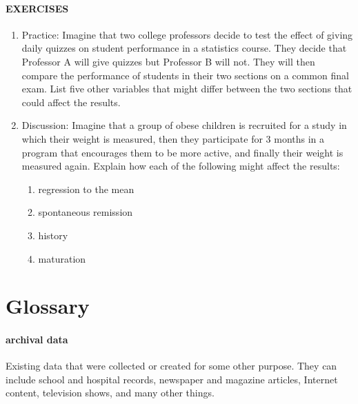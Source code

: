 \documentclass[
]{krantz}
\providecommand{\tightlist}{%
  \setlength{\itemsep}{0pt}\setlength{\parskip}{0pt}}
\begin{document}
\hypertarget{exercises-21}{%
\paragraph*{EXERCISES}\label{exercises-21}}

\begin{enumerate}
\def\labelenumi{\arabic{enumi}.}
\tightlist
\item
  Practice: Imagine that two college professors decide to test the effect of giving daily quizzes on student performance in a statistics course. They decide that Professor A will give quizzes but Professor B will not. They will then compare the performance of students in their two sections on a common final exam. List five other variables that might differ between the two sections that could affect the results.
\item
  Discussion: Imagine that a group of obese children is recruited for a study in which their weight is measured, then they participate for 3 months in a program that encourages them to be more active, and finally their weight is measured again. Explain how each of the following might affect the results:

  \begin{enumerate}
  \def\labelenumii{\alph{enumii}.}
  \tightlist
  \item
    regression to the mean
  \item
    spontaneous remission
  \item
    history
  \item
    maturation
  \end{enumerate}
\end{enumerate}

\hypertarget{glossary-8}{%
\section{Glossary}\label{glossary-8}}

\hypertarget{archival-data-1}{%
\paragraph*{archival data}\label{archival-data-1}}

Existing data that were collected or created for some other purpose. They can include school and hospital records, newspaper and magazine articles, Internet content, television shows, and many other things.
\end{document}
